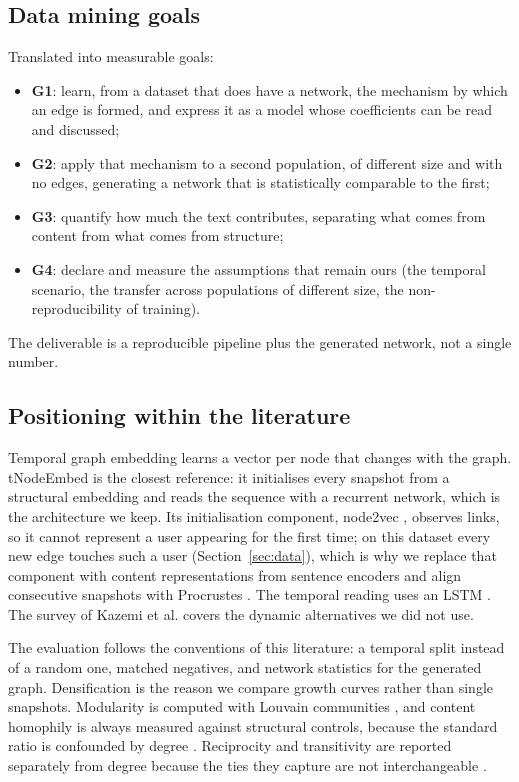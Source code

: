 \documentclass[11pt,a4paper]{article}
\begin{document}
\subsection{Data mining goals}
Translated into measurable goals:
\begin{itemize}
  \item \textbf{G1}: learn, from a dataset that does have a network, the mechanism by which an edge is
        formed, and express it as a model whose coefficients can be read and discussed;
  \item \textbf{G2}: apply that mechanism to a second population, of different size and with no
        edges, generating a network that is statistically comparable to the first;
  \item \textbf{G3}: quantify how much the text contributes, separating what comes from content from
        what comes from structure;
  \item \textbf{G4}: declare and measure the assumptions that remain ours (the temporal scenario, the
        transfer across populations of different size, the non-reproducibility of training).
\end{itemize}
The deliverable is a reproducible pipeline plus the generated network, not a single number.

\subsection{Positioning within the literature}
Temporal graph embedding learns a vector per node that changes with the graph. tNodeEmbed \cite{tne} is
the closest reference: it initialises every snapshot from a structural embedding and reads the sequence
with a recurrent network, which is the architecture we keep. Its initialisation component, node2vec
\cite{n2v}, observes links, so it cannot represent a user appearing for the first time; on this dataset
every new edge touches such a user (Section~\ref{sec:data}), which is why we replace that component with
content representations from sentence encoders \cite{sbert,mteb,bge} and align consecutive snapshots with
Procrustes \cite{procrustes}. The temporal reading uses an LSTM \cite{lstm}. The survey of Kazemi et al.
\cite{dyngraph} covers the dynamic alternatives we did not use.

The evaluation follows the conventions of this literature: a temporal split instead of a random one,
matched negatives, and network statistics for the generated graph. Densification \cite{dens} is the
reason we compare growth curves rather than single snapshots. Modularity is computed with Louvain
communities \cite{louvain}, and content homophily is always measured against structural controls, because
the standard ratio is confounded by degree \cite{homo}. Reciprocity and transitivity are reported
separately from degree because the ties they capture are not interchangeable \cite{weak}.
\end{document}
